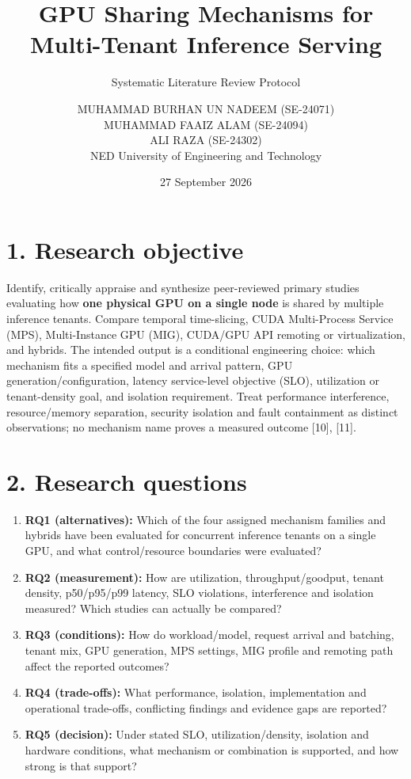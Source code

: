 \documentclass[
  12pt,
]{article}
\title{GPU Sharing Mechanisms for Multi-Tenant Inference Serving}
\subtitle{Systematic Literature Review Protocol}
\author{MUHAMMAD BURHAN UN NADEEM (SE-24071)\\[0.4em]MUHAMMAD FAAIZ ALAM (SE-24094)\\[0.4em]ALI RAZA (SE-24302)\\[0.6em]\normalsize NED University of Engineering and Technology}
\date{27 September 2026}
\providecommand{\tightlist}{%
  \setlength{\itemsep}{0pt}\setlength{\parskip}{0pt}}
\begin{document}
\maketitle

\hypertarget{1-research-objective}{%
\section{1. Research objective}\label{1-research-objective}}

Identify, critically appraise and synthesize peer-reviewed primary
studies evaluating how \textbf{one physical GPU on a single node} is
shared by multiple inference tenants. Compare temporal time-slicing,
CUDA Multi-Process Service (MPS), Multi-Instance GPU (MIG), CUDA/GPU API
remoting or virtualization, and hybrids. The intended output is a
conditional engineering choice: which mechanism fits a specified model
and arrival pattern, GPU generation/configuration, latency service-level
objective (SLO), utilization or tenant-density goal, and isolation
requirement. Treat performance interference, resource/memory separation,
security isolation and fault containment as distinct observations; no
mechanism name proves a measured outcome {[}10{]}, {[}11{]}.

\hypertarget{2-research-questions}{%
\section{2. Research questions}\label{2-research-questions}}

\begin{enumerate}
\def\labelenumi{\arabic{enumi}.}
\tightlist
\item
  \textbf{RQ1 (alternatives):} Which of the four assigned mechanism
  families and hybrids have been evaluated for concurrent inference
  tenants on a single GPU, and what control/resource boundaries were
  evaluated?
\item
  \textbf{RQ2 (measurement):} How are utilization, throughput/goodput,
  tenant density, p50/p95/p99 latency, SLO violations, interference and
  isolation measured? Which studies can actually be compared?
\item
  \textbf{RQ3 (conditions):} How do workload/model, request arrival and
  batching, tenant mix, GPU generation, MPS settings, MIG profile and
  remoting path affect the reported outcomes?
\item
  \textbf{RQ4 (trade-offs):} What performance, isolation, implementation
  and operational trade-offs, conflicting findings and evidence gaps are
  reported?
\item
  \textbf{RQ5 (decision):} Under stated SLO, utilization/density,
  isolation and hardware conditions, what mechanism or combination is
  supported, and how strong is that support?
\end{enumerate}
\end{document}
